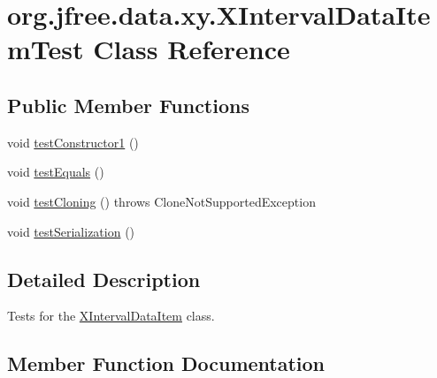 \hypertarget{classorg_1_1jfree_1_1data_1_1xy_1_1_x_interval_data_item_test}{}\section{org.\+jfree.\+data.\+xy.\+X\+Interval\+Data\+Item\+Test Class Reference}
\label{classorg_1_1jfree_1_1data_1_1xy_1_1_x_interval_data_item_test}
\subsection*{Public Member Functions}
\begin{DoxyCompactItemize}
\item 
void \mbox{\hyperlink{classorg_1_1jfree_1_1data_1_1xy_1_1_x_interval_data_item_test_ab23f7e7feec4b0b685123f7a1f56e194}{test\+Constructor1}} ()
\item 
void \mbox{\hyperlink{classorg_1_1jfree_1_1data_1_1xy_1_1_x_interval_data_item_test_af7525ff808027a67de294a91b2d167bd}{test\+Equals}} ()
\item 
void \mbox{\hyperlink{classorg_1_1jfree_1_1data_1_1xy_1_1_x_interval_data_item_test_a12203879abdaf026ec0b983fce5a2a13}{test\+Cloning}} ()  throws Clone\+Not\+Supported\+Exception 
\item 
void \mbox{\hyperlink{classorg_1_1jfree_1_1data_1_1xy_1_1_x_interval_data_item_test_aeb80b082b5c38ce27508c0d8a2353eb8}{test\+Serialization}} ()
\end{DoxyCompactItemize}


\subsection{Detailed Description}
Tests for the \mbox{\hyperlink{classorg_1_1jfree_1_1data_1_1xy_1_1_x_interval_data_item}{X\+Interval\+Data\+Item}} class. 

\subsection{Member Function Documentation}
\mbox{\label{classorg_1_1jfree_1_1data_1_1xy_1_1_x_interval_data_item_test_a12203879abdaf026ec0b983fce5a2a13}} 
